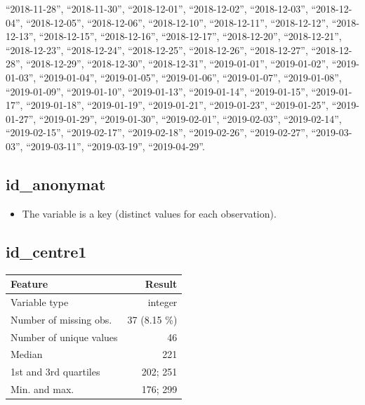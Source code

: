 \documentclass[
  letterpaper,
  DIV=11,
  numbers=noendperiod]{scrartcl}
\providecommand{\tightlist}{%
  \setlength{\itemsep}{0pt}\setlength{\parskip}{0pt}}
\begin{document}
\begin{itemize}
  ``2018-11-28'', ``2018-11-30'', ``2018-12-01'', ``2018-12-02'',
  ``2018-12-03'', ``2018-12-04'', ``2018-12-05'', ``2018-12-06'',
  ``2018-12-10'', ``2018-12-11'', ``2018-12-12'', ``2018-12-13'',
  ``2018-12-15'', ``2018-12-16'', ``2018-12-17'', ``2018-12-20'',
  ``2018-12-21'', ``2018-12-23'', ``2018-12-24'', ``2018-12-25'',
  ``2018-12-26'', ``2018-12-27'', ``2018-12-28'', ``2018-12-29'',
  ``2018-12-30'', ``2018-12-31'', ``2019-01-01'', ``2019-01-02'',
  ``2019-01-03'', ``2019-01-04'', ``2019-01-05'', ``2019-01-06'',
  ``2019-01-07'', ``2019-01-08'', ``2019-01-09'', ``2019-01-10'',
  ``2019-01-13'', ``2019-01-14'', ``2019-01-15'', ``2019-01-17'',
  ``2019-01-18'', ``2019-01-19'', ``2019-01-21'', ``2019-01-23'',
  ``2019-01-25'', ``2019-01-27'', ``2019-01-29'', ``2019-01-30'',
  ``2019-02-01'', ``2019-02-03'', ``2019-02-14'', ``2019-02-15'',
  ``2019-02-17'', ``2019-02-18'', ``2019-02-26'', ``2019-02-27'',
  ``2019-03-03'', ``2019-03-11'', ``2019-03-19'', ``2019-04-29''.
\end{itemize}

\fullline

\subsection{id\_anonymat}\label{id_anonymat}

\begin{itemize}
\tightlist
\item
  The variable is a key (distinct values for each observation).
\end{itemize}

\fullline

\subsection{id\_centre1}\label{id_centre1}

\bminione

\begin{longtable}[]{@{}lr@{}}
\toprule\noalign{}
Feature & Result \\
\midrule\noalign{}
\endhead
\bottomrule\noalign{}
\endlastfoot
Variable type & integer \\
Number of missing obs. & 37 (8.15 \%) \\
Number of unique values & 46 \\
Median & 221 \\
1st and 3rd quartiles & 202; 251 \\
Min. and max. & 176; 299 \\
\end{longtable}
\end{document}
